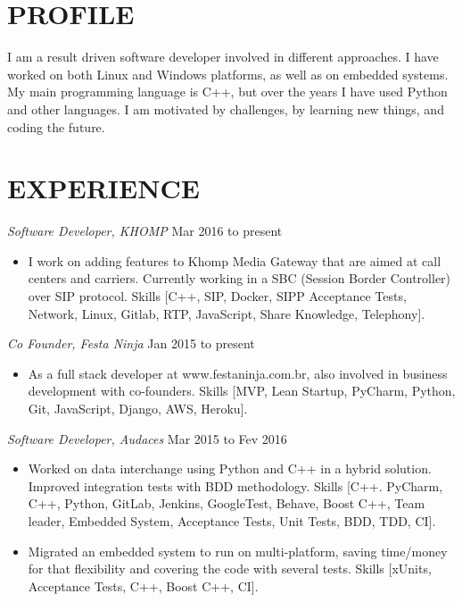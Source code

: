 \documentclass[line,margin]{res}
\begin{document}
\address{alvarofleith@gmail.com or +64 (09) 889-3534}
\address{https://linkedin.com/in/alvarofleith}


\begin{resume}

\section{PROFILE}       I am a result driven software developer involved in different approaches. I have worked on both Linux and Windows platforms, as well as on embedded systems. My main programming language is C++, but over the years I have used Python and other languages. I am motivated by challenges, by learning new things, and coding the future.


 \section{EXPERIENCE} {\sl Software Developer, KHOMP} \hfill Mar 2016 to present \\
                 \begin{itemize}  \itemsep -2pt
                 \item I work on adding features to Khomp Media Gateway that are aimed at call centers and carriers. Currently working in a SBC (Session Border Controller) over SIP protocol. Skills [C++, SIP, Docker, SIPP Acceptance Tests, Network, Linux, Gitlab, RTP, JavaScript, Share Knowledge, Telephony].
                \end{itemize}

                {\sl Co Founder, Festa Ninja} \hfill Jan 2015 to present \\
                 \begin{itemize}  \itemsep -2pt
                 \item As a full stack developer at www.festaninja.com.br, also involved in business development with co-founders. Skills [MVP, Lean Startup, PyCharm, Python, Git, JavaScript, Django, AWS, Heroku].
                 \end{itemize}

                {\sl Software Developer, Audaces} \hfill Mar 2015 to Fev 2016 \\
                  \begin{itemize}
                    \item Worked on data interchange using Python and C++ in a hybrid solution. Improved integration tests with BDD methodology. Skills [C++. PyCharm, C++, Python, GitLab, Jenkins, GoogleTest, Behave, Boost C++, Team leader, Embedded System, Acceptance Tests, Unit Tests, BDD, TDD, CI].
                    \item Migrated an embedded system to run on multi-platform, saving time/money for that flexibility and covering the code with several tests. Skills [xUnits, Acceptance Tests, C++, Boost C++, CI].
                   \end{itemize}


\end{resume}
\end{document}
